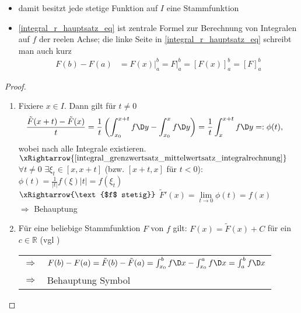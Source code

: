 \begin{remark}\vspace*{0pt}
	\begin{itemize}[topsep=\dimexpr-\baselineskip/2\relax]
		\item damit besitzt jede stetige Funktion auf $I$ eine Stammfunktion
		\item \eqref{integral_r_hauptsatz_eq} ist zentrale Formel zur Berechnung von Integralen auf $f$ der reelen Achse; die linke Seite in \eqref{integral_r_hauptsatz_eq} schreibt man auch kurz \begin{align*}
			F(b) - F(a) &= \left.F(x)\right|_a^b = \left. F\right|_a^b = [ F(x) ]_a^b = [ F ]_a^b
		\end{align*}
	\end{itemize}
\end{remark}

\begin{proof}\hspace*{0pt}
	\NoEndMark
	\begin{enumerate}[label={zu \alph*},topsep=\dimexpr-\baselineskip/2\relax,leftmargin=\widthof{\texttt{zu a)\ }}]
		\item Fixiere $x\in I$. Dann gilt für $t\neq 0$ \begin{align*}
			\frac{\tilde{F}(x + t) - \tilde{F}(x)}{t} &= \frac{1}{t} \left( \int_{x_0}^{x + t} f \D y - \int_{x_0}^{x} f \D y \right) = \frac{1}{t} \int_x^{x + t} f \D y =: \phi(t),
		\end{align*}
		wobei nach  alle Integrale existieren. \\
		$\xRightarrow{\cref{integral_grenzwertsatz_mittelwertsatz_integralrechnung}}$ $\forall t\neq 0$ $\exists \xi_t\in [x, x+t]$ (bzw. $[x + t, x]$ für $t < 0$): $\phi(t) = \frac{1}{\vert t \vert} f(\xi) \vert t \vert = f(\xi_t)$ \\
		$\xRightarrow{\text{$f$ stetig}}$ $\tilde{F}'(x) = \lim\limits_{t\to 0} \phi(t) = f(x)$ \\
		$\Rightarrow$ Behauptung
		
		\item Für eine beliebige Stammfunktion $F$ von $f$ gilt: $F(x) = \tilde{F}(x) + C$ für ein $c\in \mathbb{R}$ (vgl ) \\ \begin{tabularx}{\linewidth}{r@{\ \ }X}
		$\Rightarrow$ & $F(b) - F(a) = \tilde{F}(b) - \tilde{F}(a) = \int_{x_0}^{b} f \D x - \int_{x_0}^{a} f \D x = \int_a^b f \D x$ \\
		$\Rightarrow$ & Behauptung \hfill\csname\InTheoType Symbol\endcsname
		\end{tabularx}
	\end{enumerate}
\end{proof}

